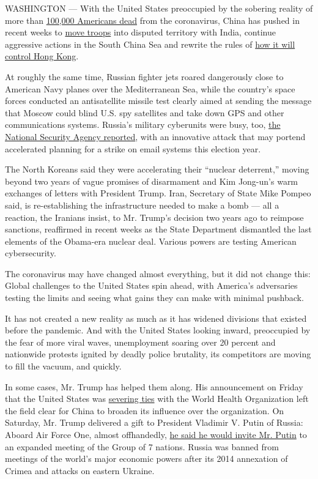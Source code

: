 WASHINGTON --- With the United States preoccupied by the sobering
reality of more than
\href{https://www.nytimes.com/interactive/2020/05/24/us/us-coronavirus-deaths-100000.html}{100,000
Americans dead} from the coronavirus, China has pushed in recent weeks
to
\href{https://www.nytimes.com/2020/05/30/world/asia/india-china-border.html}{move
troops} into disputed territory with India, continue aggressive actions
in the South China Sea and rewrite the rules of
\href{https://www.nytimes.com/2020/05/24/world/asia/china-hong-kong-taiwan.html}{how
it will control Hong Kong}.

At roughly the same time, Russian fighter jets roared dangerously close
to American Navy planes over the Mediterranean Sea, while the country's
space forces conducted an antisatellite missile test clearly aimed at
sending the message that Moscow could blind U.S. spy satellites and take
down GPS and other communications systems. Russia's military cyberunits
were busy, too,
\href{https://www.nytimes.com/2020/05/28/us/politics/nsa-russian-hack.html}{the
National Security Agency reported}, with an innovative attack that may
portend accelerated planning for a strike on email systems this election
year.

The North Koreans said they were accelerating their ``nuclear
deterrent,'' moving beyond two years of vague promises of disarmament
and Kim Jong-un's warm exchanges of letters with President Trump. Iran,
Secretary of State Mike Pompeo said, is re-establishing the
infrastructure needed to make a bomb --- all a reaction, the Iranians
insist, to Mr. Trump's decision two years ago to reimpose sanctions,
reaffirmed in recent weeks as the State Department dismantled the last
elements of the Obama-era nuclear deal. Various powers are testing
American cybersecurity.

The coronavirus may have changed almost everything, but it did not
change this: Global challenges to the United States spin ahead, with
America's adversaries testing the limits and seeing what gains they can
make with minimal pushback.

It has not created a new reality as much as it has widened divisions
that existed before the pandemic. And with the United States looking
inward, preoccupied by the fear of more viral waves, unemployment
soaring over 20 percent and nationwide protests ignited by deadly police
brutality, its competitors are moving to fill the vacuum, and quickly.

In some cases, Mr. Trump has helped them along. His announcement on
Friday that the United States was
\href{https://www.nytimes.com/2020/05/29/us/politics/trump-hong-kong-china-WHO.html}{severing
ties} with the World Health Organization left the field clear for China
to broaden its influence over the organization. On Saturday, Mr. Trump
delivered a gift to President Vladimir V. Putin of Russia: Aboard Air
Force One, almost offhandedly,
\href{https://www.nytimes.com/2020/05/30/us/politics/trump-g7-russia.html}{he
said he would invite Mr. Putin} to an expanded meeting of the Group of 7
nations. Russia was banned from meetings of the world's major economic
powers after its 2014 annexation of Crimea and attacks on eastern
Ukraine.

